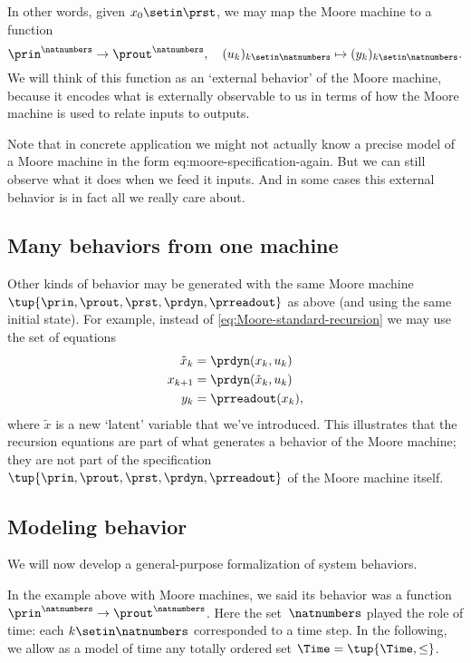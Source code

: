 {    In other words, given $x_0 \setin \prst$, we may map the Moore machine \label{eq:moore-again} to a function
    \begin{equation}
        \prin^\natnumbers \to \prout^\natnumbers,  \quad (u_k)_{k \setin \natnumbers} \mapsto (y_k)_{k \setin \natnumbers}.
    \end{equation}
    We will think of this function as an `external behavior' of the Moore machine, because it encodes what is externally observable to us in terms of how the Moore machine is used to relate inputs to outputs.

    Note that in concrete application we might not actually know a precise model of a Moore machine in the form {eq:moore-specification-again}.
    But we can still observe what it does when we feed it inputs.
    And in some cases this external behavior is in fact all we really care about.

    \subsection{Many behaviors from one machine}

    Other kinds of behavior may be generated with the same Moore machine $\tup{\prin, \prout, \prst, \prdyn, \prreadout}$ as above (and using the same initial state).
    For example, instead of \cref{eq:Moore-standard-recursion} we may use the set of equations
    \begin{align}
        \tilde x_{k} & = \prdyn(x_k, u_k) \\
        x_{k+1}      & = \prdyn(\tilde x_{k}, u_k) \\
        y_{k}        & = \prreadout(x_{k}),
    \end{align}
    where $\tilde x$ is a new `latent' variable that we've introduced.
    This illustrates that the recursion equations are part of what generates a behavior of the Moore machine; they are not part of the specification $\tup{\prin, \prout, \prst, \prdyn, \prreadout}$ of the Moore machine itself.

    \subsection{Modeling behavior}

    We will now develop a general-purpose formalization of system behaviors.

    In the example above with Moore machines, we said its behavior was a function $\prin^\natnumbers \to \prout^\natnumbers$.
    Here the set~$\natnumbers$ played the role of time: each $k \setin \natnumbers$ corresponded to a time step.
    In the following, we allow as a model of time any totally ordered set $\Time = \tup{\Time, \leq}$.

}
